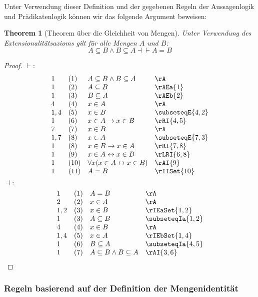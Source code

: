 \documentclass{book}
\theoremstyle{plain}
\newtheorem{theorem}{Theorem}
\theoremstyle{remark}
\theoremstyle{definition}
\begin{document}
Unter Verwendung dieser Definition und der gegebenen Regeln der Aussagenlogik und Prädikatenlogik können wir das folgende Argument beweisen: 
\begin{theorem}[Theorem über die Gleichheit von Mengen]
	Unter Verwendung des Extensionalitätsaxioms gilt für alle Mengen $A$ und $B$:
	\[
	A \subseteq B\land B \subseteq A\dashv\vdash A = B 
	\]
\end{theorem}
\begin{proof}
	\(\vdash:\)
	\[
	\begin{array}{llll}
		1 & (1) & A \subseteq B\land B\subseteq A & \rA \\
		1 & (2) & A \subseteq B & \rAEa{1} \\
		1 & (3) & B \subseteq A & \rAEb{2} \\
		4 & (4) & x\in A & \rA \\
		1,4 & (5) & x\in B & \subseteqE{4,2} \\
		1 & (6) & x\in A\rightarrow x\in B & \rRI{4,5} \\
		7 & (7) & x\in B & \rA \\
		1,7 & (8) & x\in A & \subseteqE{7,3} \\
		1 & (8) & x\in B\rightarrow x\in A & \rRI{7,8} \\
		1 & (9) & x\in A\leftrightarrow x\in B & \rLRI{6,8} \\
		1 & (10) & \forall x(x\in A\leftrightarrow x\in B) & \rAI{9} \\		
		1 & (11) & A=B & \rIISet{10} \\
	\end{array}
	\]
	\(\dashv:\)
	\[
	\begin{array}{llll}
		1 & (1) & A = B & \rA \\
		2 & (2) & x\in A & \rA \\		
		1,2 & (3) & x\in B & \rIEaSet{1,2} \\
		1 & (3) & A\subseteq B & \subseteqIa{1,2} \\
		4 & (4) & x\in B & \rA \\		
		1,4 & (5) & x\in A & \rIEbSet{1,4} \\
		1 & (6) & B\subseteq A & \subseteqIa{4,5} \\
		1 & (7) & A\subseteq B\land B\subseteq A & \rAI{3,6} \\
	\end{array}
	\]
\end{proof}

\subsubsection{Regeln basierend auf der Definition der Mengenidentität}
\label{rule:rIIaSet} \label{rule:subsetEqI}
\end{document}
